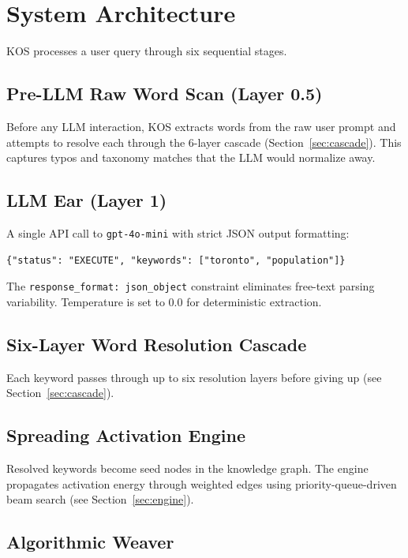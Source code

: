 \documentclass[11pt,a4paper]{article}
\begin{document}
\section{System Architecture}

KOS processes a user query through six sequential stages.

\subsection{Pre-LLM Raw Word Scan (Layer 0.5)}

Before any LLM interaction, KOS extracts words from the raw user prompt and attempts to resolve each through the 6-layer cascade (Section~\ref{sec:cascade}). This captures typos and taxonomy matches that the LLM would normalize away.

\subsection{LLM Ear (Layer 1)}

A single API call to \texttt{gpt-4o-mini} with strict JSON output formatting:

\begin{lstlisting}[language={},caption={LLM Ear output format}]
{"status": "EXECUTE", "keywords": ["toronto", "population"]}
\end{lstlisting}

The \texttt{response\_format: json\_object} constraint eliminates free-text parsing variability. Temperature is set to 0.0 for deterministic extraction.

\subsection{Six-Layer Word Resolution Cascade}

Each keyword passes through up to six resolution layers before giving up (see Section~\ref{sec:cascade}).

\subsection{Spreading Activation Engine}

Resolved keywords become seed nodes in the knowledge graph. The engine propagates activation energy through weighted edges using priority-queue-driven beam search (see Section~\ref{sec:engine}).

\subsection{Algorithmic Weaver}
\end{document}
